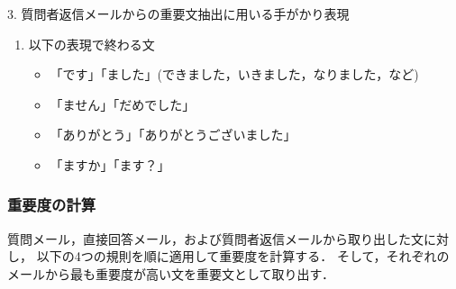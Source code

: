 \begin{table}[tbp]
\begin{center}
\begin{enumerate}
    \end{enumerate}

    \vspace{4mm}

    3. 質問者返信メールからの重要文抽出に用いる手がかり表現
    \begin{enumerate}
     
     \item 以下の表現で終わる文
	   \begin{itemize}
	    \item 「です」「ました」(できました，いきました，なりました，など)

	    \item 「ません」「だめでした」
	    \item 「ありがとう」「ありがとうございました」
	    \item 「ますか」「ます？」
	   \end{itemize}
    \end{enumerate}

   \end{center}

  \end{table}

 
  \subsubsection{重要度の計算}
  
  質問メール，直接回答メール，および質問者返信メールから取り出した文に対し，
  以下の4つの規則を順に適用して重要度を計算する．
  そして，それぞれのメールから最も重要度が高い文を重要文として取り出す．
  
